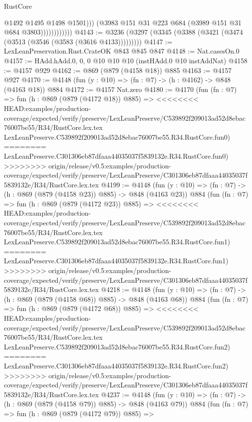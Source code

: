 \begin{lexlean}{RustCore}
\begin{coremodule}
{\begin{coremodule}
{{{{{{{{                              @1492
                              @1495
                              @1498
                              @1501)))
                        (@3983 @151 @31 @223 @684 (@3989 @151 @31 @684 @3803))))))))))))
@4143 := @3236 (@3297 (@3345 (@3388 (@3421 (@3474 (@3513 (@3546 (@3583 (@3616 @4133)))))))))
@4147 := LexLeanPreservation.Rust.CrateOK @843 @845 @847
@4148 := Nat.casesOn.{0}
@4157 := HAdd.hAdd.{0, 0, 0} @10 @10 @10 (instHAdd.{0} @10 instAddNat)
@4158 := @4157 @929
@4162 := @869 (@879 (@4158 @18)) @885
@4163 := @4157 @927
@4170 := @4148 (fun (y : @10) => (fn : @7) -> (h : @4162) -> @848 (@4163 @18)) @884
@4172 := @4157 Nat.zero
@4180 := @4170
    (fun (fn : @7) =>
    fun (h : @869 (@879 (@4172 @18)) @885) =>
<<<<<<<< HEAD:examples/production-coverage/expected/verify/preserve/LexLeanPreserve/C539892f209013ad52d8ebac76007be55/R34/RustCore.lex.tex
    LexLeanPreserve.C539892f209013ad52d8ebac76007be55.R34.RustCore.fun0)
========
    LexLeanPreserve.C301306eb87dfaaa44035037f5839132e.R34.RustCore.fun0)
>>>>>>>> origin/release/v0.5:examples/production-coverage/expected/verify/preserve/LexLeanPreserve/C301306eb87dfaaa44035037f5839132e/R34/RustCore.lex.tex
@4199 := @4148
    (fun (y : @10) => (fn : @7) -> (h : @869 (@879 (@4158 @23)) @885) -> @848 (@4163 @23))
    @884
    (fun (fn : @7) =>
    fun (h : @869 (@879 (@4172 @23)) @885) =>
<<<<<<<< HEAD:examples/production-coverage/expected/verify/preserve/LexLeanPreserve/C539892f209013ad52d8ebac76007be55/R34/RustCore.lex.tex
    LexLeanPreserve.C539892f209013ad52d8ebac76007be55.R34.RustCore.fun1)
========
    LexLeanPreserve.C301306eb87dfaaa44035037f5839132e.R34.RustCore.fun1)
>>>>>>>> origin/release/v0.5:examples/production-coverage/expected/verify/preserve/LexLeanPreserve/C301306eb87dfaaa44035037f5839132e/R34/RustCore.lex.tex
@4218 := @4148
    (fun (y : @10) => (fn : @7) -> (h : @869 (@879 (@4158 @68)) @885) -> @848 (@4163 @68))
    @884
    (fun (fn : @7) =>
    fun (h : @869 (@879 (@4172 @68)) @885) =>
<<<<<<<< HEAD:examples/production-coverage/expected/verify/preserve/LexLeanPreserve/C539892f209013ad52d8ebac76007be55/R34/RustCore.lex.tex
    LexLeanPreserve.C539892f209013ad52d8ebac76007be55.R34.RustCore.fun2)
========
    LexLeanPreserve.C301306eb87dfaaa44035037f5839132e.R34.RustCore.fun2)
>>>>>>>> origin/release/v0.5:examples/production-coverage/expected/verify/preserve/LexLeanPreserve/C301306eb87dfaaa44035037f5839132e/R34/RustCore.lex.tex
@4237 := @4148
    (fun (y : @10) => (fn : @7) -> (h : @869 (@879 (@4158 @79)) @885) -> @848 (@4163 @79))
    @884
    (fun (fn : @7) =>
    fun (h : @869 (@879 (@4172 @79)) @885) =>
}}}}}}}}
\end{coremodule}}
\end{coremodule}
\end{lexlean}
